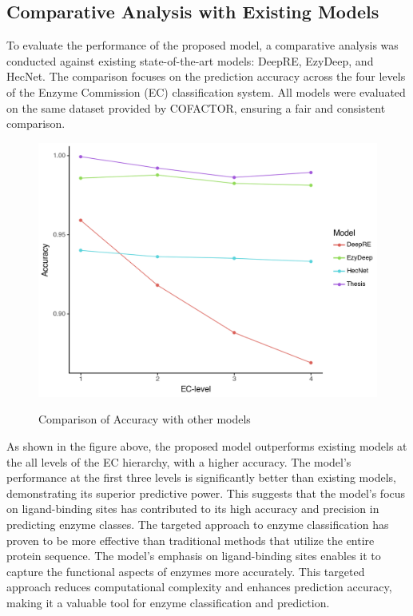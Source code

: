 \pagebreak

\subsection{Comparative Analysis with Existing Models}
\label{sec:Comparative Analysis with Existing Models}

To evaluate the performance of the proposed model, a comparative analysis was conducted against existing state-of-the-art models: DeepRE, EzyDeep, and HecNet. The comparison focuses on the prediction accuracy across the four levels of the Enzyme Commission (EC) classification system. All models were evaluated on the same dataset provided by COFACTOR, ensuring a fair and consistent comparison. \autocite{zhangCOFACTORImprovedProtein2017}

\begin{figure}[!h]
    \centering
    \begin{minipage}[t]{\textwidth}
    \caption{Comparison of Accuracy with other models}
    \includegraphics[scale=0.7]{img/comparison-with-other-models.png}
    \label{fig:comparison-with-other-models}
    \end{minipage}
\end{figure}

As shown in the figure above, the proposed model outperforms existing models at the all levels of the EC hierarchy, with a higher accuracy. The model's performance at the first three levels is significantly better than existing models, demonstrating its superior predictive power. This suggests that the model's focus on ligand-binding sites has contributed to its high accuracy and precision in predicting enzyme classes. The targeted approach to enzyme classification has proven to be more effective than traditional methods that utilize the entire protein sequence. The model's emphasis on ligand-binding sites enables it to capture the functional aspects of enzymes more accurately. This targeted approach reduces computational complexity and enhances prediction accuracy, making it a valuable tool for enzyme classification and prediction.

